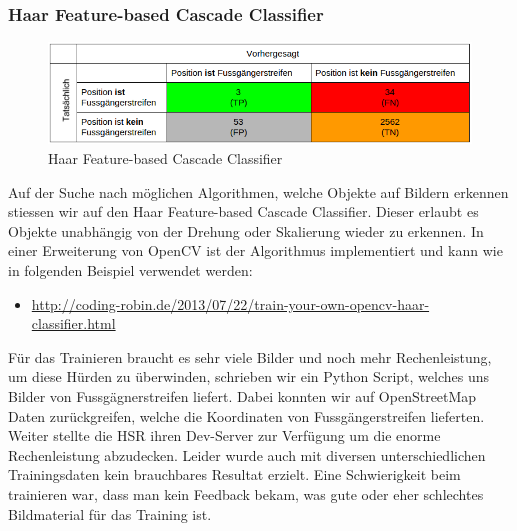 \subsubsection{Haar Feature-based Cascade Classifier}
\begin{figure}[H]
\includegraphics[width=\textwidth]{images/haar_conf.png}
\caption[Haar Feature-based Cascade Classifier]{Haar Feature-based Cascade Classifier}
\end{figure}
Auf der Suche nach möglichen Algorithmen, welche Objekte auf Bildern erkennen stiessen wir auf den Haar Feature-based Cascade Classifier. Dieser erlaubt es Objekte unabhängig von der Drehung oder Skalierung wieder zu erkennen. In einer Erweiterung von OpenCV ist der Algorithmus implementiert und kann wie in folgenden Beispiel verwendet werden: 
\begin{itemize}
	\item \url{http://coding-robin.de/2013/07/22/train-your-own-opencv-haar-classifier.html}
\end{itemize}
Für das Trainieren braucht es sehr viele Bilder und noch mehr Rechenleistung, um diese Hürden zu überwinden, schrieben wir ein Python Script, welches uns Bilder von Fussgägnerstreifen liefert. Dabei konnten wir auf OpenStreetMap Daten zurückgreifen, welche die Koordinaten von Fussgängerstreifen lieferten. Weiter stellte die HSR ihren Dev-Server zur Verfügung um die enorme Rechenleistung abzudecken. Leider wurde auch mit diversen unterschiedlichen Trainingsdaten kein brauchbares Resultat erzielt. Eine Schwierigkeit beim trainieren war, dass man kein Feedback bekam, was gute oder eher schlechtes Bildmaterial für das Training ist.

